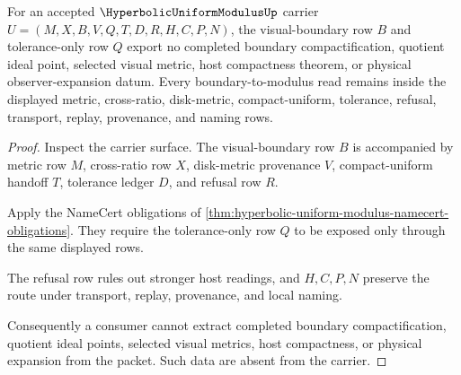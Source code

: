 \begin{theorem}
\label{thm:hyperbolic-uniform-modulus-boundary-nonescape}
For an accepted $\HyperbolicUniformModulusUp$ carrier $U=(M,X,B,V,Q,T,D,R,H,C,P,N)$, the visual-boundary row $B$ and tolerance-only row $Q$ export no completed boundary compactification, quotient ideal point, selected visual metric, host compactness theorem, or physical observer-expansion datum. Every boundary-to-modulus read remains inside the displayed metric, cross-ratio, disk-metric, compact-uniform, tolerance, refusal, transport, replay, provenance, and naming rows.
\end{theorem}
\begin{proof}
Inspect the carrier surface. The visual-boundary row $B$ is accompanied by metric row $M$, cross-ratio row $X$, disk-metric provenance $V$, compact-uniform handoff $T$, tolerance ledger $D$, and refusal row $R$.

Apply the NameCert obligations of \autoref{thm:hyperbolic-uniform-modulus-namecert-obligations}. They require the tolerance-only row $Q$ to be exposed only through the same displayed rows.

The refusal row rules out stronger host readings, and $H,C,P,N$ preserve the route under transport, replay, provenance, and local naming.

Consequently a consumer cannot extract completed boundary compactification, quotient ideal points, selected visual metrics, host compactness, or physical expansion from the packet. Such data are absent from the carrier.
\end{proof}




